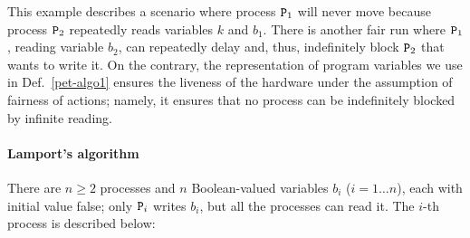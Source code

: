 \documentclass[copyright,creativecommons]{eptcs}
\newcommand{\proc}{{\tt P}}
\begin{document}
This example describes a scenario where process $\proc_1$ will never move
because process $\proc_2$ repeatedly reads variables $k$ and $b_1$. There
is another fair run where $\proc_1$, reading variable $b_2$, can
repeatedly delay and, thus,  indefinitely block $\proc_2$ that wants to
write it. On the contrary, the representation of program variables we use
in Def.~\ref{pet-algo1} ensures the liveness of the hardware under the
assumption of fairness of actions; namely, it ensures that no process can
be indefinitely blocked by infinite reading. 




\paragraph{Lamport's algorithm}
There are $n \geq 2$ processes and $n$ Boolean-valued variables $b_i$ ($i =
1 \ldots n$), each with initial value false;  only $\proc_i$ writes $b_i$,
but all the processes can read it. The $i$-th process is described below:
\end{document}
